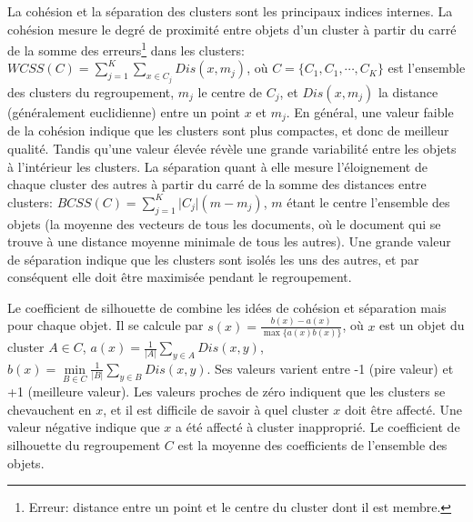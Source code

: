  La cohésion et la séparation des clusters sont les principaux indices internes. La cohésion mesure le degré de proximité entre objets d'un cluster à partir du carré de la somme des erreurs\footnote{Erreur: distance entre un point et le centre du cluster dont il est membre.} dans les clusters: $WCSS(C) = \sum\limits_{j=1}^K\sum\limits_{x \in C_j} Dis(x, m_j)$, où $C = \lbrace C_1, C_1, \cdots, C_K \rbrace$ est l'ensemble des clusters du regroupement, $m_j$ le centre de $C_j$, et $Dis(x,m_j)$ la distance (généralement euclidienne) entre un point $x$ et $m_j$. En général, une valeur faible de la cohésion indique que les clusters sont plus compactes, et donc de meilleur qualité. Tandis qu'une valeur élevée révèle une grande variabilité entre les objets à l'intérieur les clusters. La séparation quant à elle mesure l'éloignement de chaque cluster des autres à partir du carré de la somme des distances entre clusters: $BCSS(C) = \sum\limits_{j = 1}^{K} \vert C_j \vert (m - m_j)$, 
  $m$ étant le centre l'ensemble des objets (la moyenne des vecteurs de tous les documents, où le document qui se trouve à une distance moyenne minimale de tous les autres). Une grande valeur de séparation indique que les clusters sont isolés les uns des autres, et par conséquent elle doit être maximisée pendant le regroupement.
 
 Le coefficient de silhouette de \citet{rousseeuw1987silhouetteclusternumber} combine les idées de cohésion et séparation mais pour chaque objet. Il se calcule par $s(x) = \frac{b(x
) - a(x)}{\max\lbrace a(x)b(x) \rbrace}$, où $x$ est un objet du cluster $A \in C$, $a(x) = \frac{1}{\vert A \vert} \sum\limits_{y\in A} Dis(x,y)$, $b(x) = \min\limits_{B \in C}\frac{1}{\vert B \vert} \sum\limits_{y\in B} Dis(x,y)$. Ses valeurs varient entre -1 (pire valeur) et +1 (meilleure valeur). Les valeurs proches de zéro indiquent que les clusters se chevauchent en $x$, et il est difficile de savoir à quel cluster $x$ doit être affecté. Une valeur négative indique que $x$ a été affecté à cluster inapproprié. Le coefficient de silhouette du regroupement $C$ est la moyenne des coefficients de l'ensemble des  objets.



